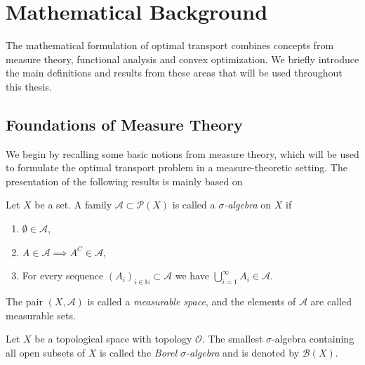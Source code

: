 \section{Mathematical Background}

The mathematical formulation of optimal transport
combines concepts from measure theory, functional
analysis and convex optimization. We briefly
introduce the main definitions and results from
these areas that will be used throughout this thesis.

\subsection{Foundations of Measure Theory}
We begin by recalling some basic notions from measure theory, which will be used to formulate the optimal transport problem in a measure-theoretic setting. The presentation of the following results is mainly based on \cite{Folland} 
\begin{definition}
	Let $X$ be a set. A family $\mathcal{A}\subset \mathcal{P}(X)$ is called a \emph{$\sigma$-algebra} on $X$ if%
	\begin{enumerate}
		\item $\emptyset \in \mathcal{A}$,
		\item $A\in \mathcal{A} \implies A^C\in \mathcal{A}$,
		\item For every sequence $(A_i)_{i\in \mathbb{N}} \subset \mathcal{A}$ we have $\bigcup\limits_{i=1}^\infty A_i \in \mathcal{A}.$
	\end{enumerate}
\end{definition}
The pair $(X,\mathcal{A})$ is called a
\emph{measurable space}, and the elements of
$\mathcal{A}$ are called measurable sets.

\begin{definition}
    Let $X$ be a topological space with topology
    $\mathcal{O}$. The smallest $\sigma$-algebra
    containing all open subsets of $X$ is called
    the \emph{Borel $\sigma$-algebra} and is
    denoted by $\mathcal{B}(X)$.
\end{definition}

